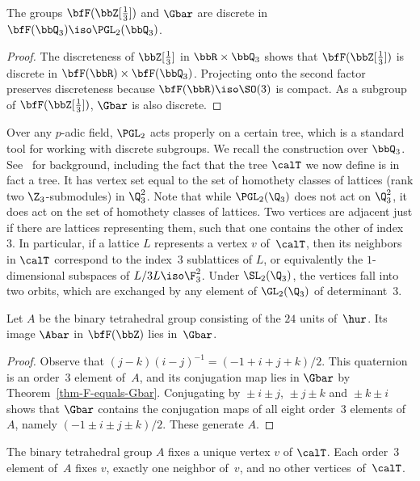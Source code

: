 \begin{lem}\label{LemDiscreteness}
The groups $\bfF(\bbZ[\frac13])$ and $\Gbar$ are discrete in $\bfF(\bbQ_3)\iso\PGL_2(\bbQ_3)$.
\end{lem}

\begin{proof}
The discreteness of $\bbZ[\frac13]$ in $\bbR\times\bbQ_3$ shows that $\bfF(\bbZ[\frac13])$ is discrete in $\bfF(\bbR)\times\bfF(\bbQ_3)$. Projecting onto the second factor preserves discreteness because $\bfF(\bbR)\iso\SO(3)$ is compact. As a subgroup of $\bfF(\bbZ[\frac13])$, $\Gbar$ is also discrete.
\end{proof}

Over any $p$-adic field, $\PGL_2$ acts properly on a certain tree, which is a standard tool for working with discrete subgroups. We recall the construction over $\bbQ_3$. See~\cite[Section~II.1.1]{Trees} for background, including the fact that the tree $\calT$ we now define is in fact a tree. It has vertex set equal to the set of homothety classes of lattices (rank two $\Z_3$-submodules) in $\Q_3^2$. Note that while $\PGL_2(\Q_3)$ does not act on $\Q_3^2$, it does act on the set of homothety classes of lattices. Two vertices are adjacent just if there are lattices representing them, such that one contains the other of index~$3$. In particular, if a lattice $L$ represents a vertex $v$ of~$\calT$, then its neighbors in $\calT$ correspond to the index~$3$ sublattices of $L$, or equivalently the $1$-dimensional subspaces of $L/3L\iso\F_3^2$. Under $\SL_2(\Q_3)$, the vertices fall into two orbits, which are exchanged by any element of $\GL_2(\Q_3)$ of determinant~$3$.

\begin{lem}\label{lemBinTet}
Let $A$ be the binary tetrahedral group consisting of the $24$ units of~$\hur$. Its image $\Abar$ in $\bfF(\bbZ)$ lies in~$\Gbar$.
\end{lem}

\begin{proof}
Observe that $(j-k)(i-j)^{-1} = (-1+i+j+k)/2$. This quaternion is an order~$3$ element of~$A$, and its conjugation map lies in $\Gbar$ by Theorem~\ref{thm-F-equals-Gbar}. Conjugating by ${ }\pm i\pm j$, ${ }\pm j\pm k$ and ${ }\pm k\pm i$ shows that $\Gbar$ contains the conjugation maps of all eight order~$3$ elements of~$A$, namely $(-1\pm i\pm j\pm k)/2$. These generate $A$.
\end{proof}

\begin{lem}\label{lem3.5}
\label{lem-A-action-on-T}
The binary tetrahedral group $A$ fixes a unique vertex $v$ of $\calT$. Each order~$3$ element of~$A$ fixes $v$, exactly one neighbor of~$v$, and no other vertices~of~$\calT$.
\end{lem}

